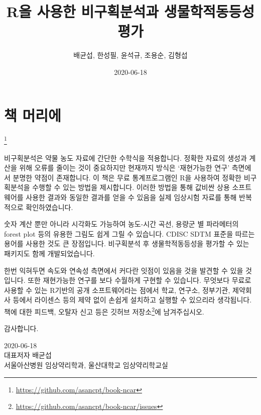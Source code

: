 \documentclass[
  10pt,
]{krantz}
\title{R을 사용한 비구획분석과 생물학적동등성 평가}
\author{배균섭, 한성필, 윤석규, 조용순, 김형섭}
\date{2020-06-18}
\renewcommand{\href}[2]{#2\footnote{\url{#1}}}
\begin{document}
\maketitle

\thispagestyle{empty}
\begin{center}
\end{center}

\setlength{\abovedisplayskip}{-5pt}
\setlength{\abovedisplayshortskip}{-5pt}

{
\hypersetup{linkcolor=}
\setcounter{tocdepth}{2}
\tableofcontents
}
\hypertarget{uxcc45-uxba38uxb9acuxc5d0}{%
\chapter*{책 머리에}\label{uxcc45-uxba38uxb9acuxc5d0}}


\href{https://github.com/asancpt/book-ncar}{}

비구획분석은 약물 농도 자료에 간단한 수학식을 적용합니다. 정확한 자료의 생성과 계산을 위해 오류를 줄이는 것이 중요하지만 현재까지 방식은 `재현가능한 연구' 측면에서 분명한 약점이 존재합니다. 이 책은 무료 통계프로그램인 R을 사용하여 정확한 비구획분석을 수행할 수 있는 방법을 제시합니다.
이러한 방법을 통해 값비싼 상용 소프트웨어를 사용한 결과와 동일한 결과를 얻을 수 있음을 실제 임상시험 자료를 통해 반복적으로 확인하였습니다.

숫자 계산 뿐만 아니라 시각화도 가능하여 농도-시간 곡선, 용량군 별 파라메터의 forest plot 등의 유용한 그림도 쉽게 그릴 수 있습니다.
CDISC SDTM 표준을 따르는 용어를 사용한 것도 큰 장점입니다.
비구획분석 후 생물학적동등성을 평가할 수 있는 패키지도 함께 개발되었습니다.

한번 익혀두면 속도와 연속성 측면에서 커다란 잇점이 있음을 것을 발견할 수 있을 것입니다.
또한 재현가능한 연구를 보다 수월하게 구현할 수 있습니다.
무엇보다 무료로 사용할 수 있는 R기반의 공개 소프트웨어라는 점에서 학교, 연구소, 정부기관, 제약회사 등에서 라이센스 등의 제약 없이 손쉽게 설치하고 실행할 수 있으리라 생각됩니다.
책에 대한 피드백, 오탈자 신고 등은 \href{https://github.com/asancpt/book-ncar/issues}{깃허브 저장소}에 남겨주십시오.

감사합니다.

2020-06-18\\
대표저자 배균섭\\
서울아산병원 임상약리학과, 울산대학교 임상약리학교실
\end{document}
